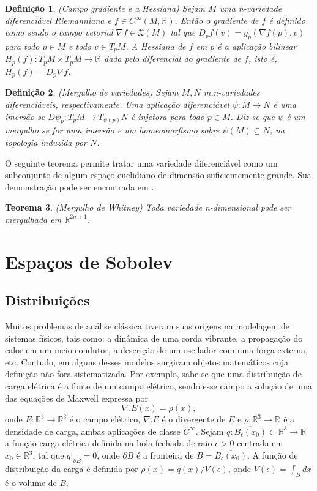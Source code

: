 \documentclass[12pt]{book}
\newtheorem{teorema}{Teorema}[section]
\newtheorem{definicao}[teorema]{Definição}
\newcommand{\campossuaves}[1]{\mathfrak{X}(#1)}
\newcommand{\funcoessuaves}[1]{C^{\infty}(#1, \real{})}
\newcommand{\gradiente}{\nabla f}
\newcommand{\real}[1]{\mathbb{R}^{#1}}
\newcommand{\reta}{\real{}}
\begin{document}
	\begin{definicao}\label{definicao_gradiente_hessiana}
		(Campo gradiente e a Hessiana) Sejam $M$ uma n-variedade diferenciável Riemanniana e $f\in \funcoessuaves{M}$. Então o gradiente de $f$ é definido como sendo o campo vetorial $\gradiente \in \campossuaves{M}$ tal que $D_{p}f(v) = g_{p}(\gradiente(p), v)$ para todo $p\in M$ e todo $v \in T_{p}M$. A Hessiana de $f$ em $p$ é a aplicação bilinear $H_{p}(f): T_{p}M\times T_{p}M \to \reta$ dada pelo diferencial do gradiente de $f$, isto é, $H_{p}(f) = D_{p}\gradiente$.
	\end{definicao}
	
	\begin{definicao}\label{definicao_mergulho_variedades}
			(Mergulho de variedades) Sejam $M, N$ m,n-variedades diferenciáveis, respectivamente. Uma aplicação diferenciável $\psi:M\to N$ é uma imersão se $D\psi_{p}:T_{p}M\to T_{\psi(p)}N$ é injetora para todo $p \in M$. Diz-se que $\psi$ é um mergulho se for uma imersão e um homeomorfismo sobre $\psi(M) \subseteq N$, na topologia induzida por $N$. 
	\end{definicao}
	
	O seguinte teorema permite tratar uma variedade diferenciável como um subconjunto de algum espaço euclidiano de dimensão suficientemente grande. Sua demonstração pode ser encontrada em \cite{guillemin_differential_topology}.
	
	\begin{teorema}\label{teorema_whitney}
			(Mergulho de Whitney) Toda variedade n-dimensional pode ser mergulhada em $\real{2n+1}$.
	\end{teorema}
	
	
	\chapter{Espaços de Sobolev}
	\section{Distribuições}\label{secao_distribuicoes}
	Muitos problemas de análise clássica tiveram suas origens na modelagem de sistemas físicos, tais como: a dinâmica de uma corda vibrante, a propagação do calor em um meio condutor, a descrição de um oscilador com uma força externa, etc. Contudo, em alguns desses modelos surgiram objetos matemáticos cuja definição não fora sistematizada. Por exemplo, sabe-se que uma distribuição de carga elétrica é a fonte de um campo elétrico, sendo esse campo a solução de uma das equações de Maxwell expressa por
	$$
	\nabla.E(x) = \rho(x),
	$$
	onde $E:\real{3} \to \real{3} $ é o campo elétrico, $\nabla.E$ é o divergente de $E$ e $\rho:\real{3}\to \reta$ é a densidade de carga, ambas aplicações de classe $C^{\infty}$. Sejam $q:\overline{B_{\epsilon}(x_{0})} \subset \real{3}\to \reta$ a função carga elétrica definida na bola fechada de raio $\epsilon>0$ centrada em $x_{0}\in \real{3}$, tal que $q|_{\partial B} = 0$, onde $\partial B$ é a fronteira de $B=\overline{B_{\epsilon}(x_{0})}$. A função de distribuição da carga é definida por $\rho(x)=q(x)/V(\epsilon)$, onde $V(\epsilon)=\int_{B}dx$ é o volume de $B$.
	
\end{document}
